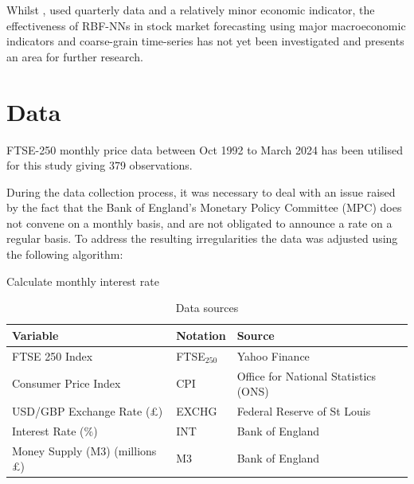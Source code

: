 \documentclass[11pt,a4paper]{article}
\newcommand{\citeboth}[1]{\citeauthor{#1} \citep{#1}}
\begin{document}
Whilst \citeboth{abotaleb2024}, used quarterly data and a relatively minor economic indicator, the effectiveness of RBF-NNs in stock market forecasting using 
major macroeconomic indicators and coarse-grain time-series has not yet been investigated and presents an area for further 
research. 

\section{Data}

FTSE-250 monthly price data between Oct 1992 to March 2024 has been utilised for this study giving 379 observations.

During the data collection process, it was necessary to deal with an issue raised by the fact that the Bank of England’s Monetary Policy Committee (MPC) 
does not convene on a monthly basis, and are not obligated to 
announce a rate on a regular basis. To address the resulting irregularities the data was adjusted using the following algorithm:

\begin{algorithm}[H]
    \caption{Calculate monthly interest rate}
    \label{alg:interest_rate_adjustment}
    
\end{algorithm}


\begin{table}[h!]
    \centering
    \caption{Data sources}
    \begin{tabular}{lll}
        \toprule
        \textbf{Variable} & \textbf{Notation} & \textbf{Source} \\
        \midrule
        FTSE 250 Index & FTSE$_{250}$ & Yahoo Finance \\
        Consumer Price Index & CPI & Office for National Statistics (ONS) \\
        USD/GBP Exchange Rate (£) & EXCHG & Federal Reserve of St Louis \\
        Interest Rate ($\%$) & INT & Bank of England \\
        Money Supply (M3) (millions £) & M3 & Bank of England \\
        \bottomrule
    \end{tabular}
\end{table}
\end{document}
